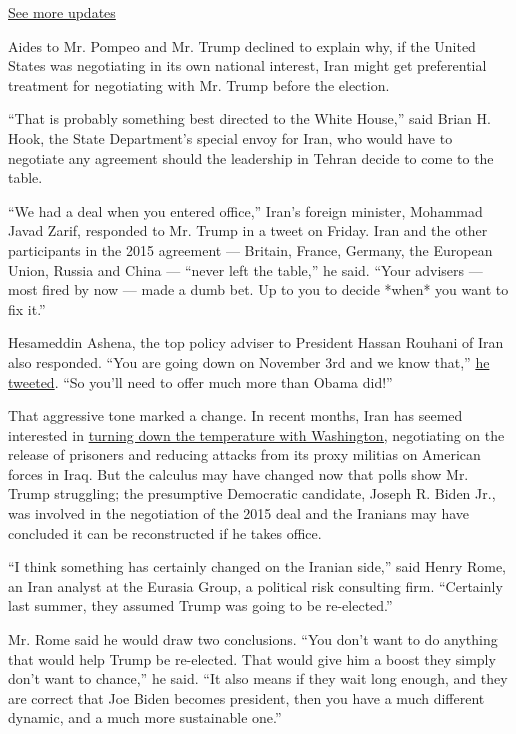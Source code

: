 \href{https://www.nytimes.com/2020/07/31/us/elections/biden-vs-trump.html?action=click\&pgtype=Article\&state=default\&region=MAIN_CONTENT_1\&context=storylines_live_updates}{See
more updates}

Aides to Mr. Pompeo and Mr. Trump declined to explain why, if the United
States was negotiating in its own national interest, Iran might get
preferential treatment for negotiating with Mr. Trump before the
election.

``That is probably something best directed to the White House,'' said
Brian H. Hook, the State Department's special envoy for Iran, who would
have to negotiate any agreement should the leadership in Tehran decide
to come to the table.

``We had a deal when you entered office,'' Iran's foreign minister,
Mohammad Javad Zarif, responded to Mr. Trump in a tweet on Friday. Iran
and the other participants in the 2015 agreement --- Britain, France,
Germany, the European Union, Russia and China --- ``never left the
table,'' he said. ``Your advisers --- most fired by now --- made a dumb
bet. Up to you to decide *when* you want to fix it.''

Hesameddin Ashena, the top policy adviser to President Hassan Rouhani of
Iran also responded. ``You are going down on November 3rd and we know
that,''
\href{https://twitter.com/hesamodin1/status/1268867213819346944}{he
tweeted}. ``So you'll need to offer much more than Obama did!''

That aggressive tone marked a change. In recent months, Iran has seemed
interested in
\href{https://www.nytimes.com/2020/05/19/world/middleeast/iran-us-relations.html?searchResultPosition=4}{turning
down the temperature with Washington,} negotiating on the release of
prisoners and reducing attacks from its proxy militias on American
forces in Iraq. But the calculus may have changed now that polls show
Mr. Trump struggling; the presumptive Democratic candidate, Joseph R.
Biden Jr., was involved in the negotiation of the 2015 deal and the
Iranians may have concluded it can be reconstructed if he takes office.

``I think something has certainly changed on the Iranian side,'' said
Henry Rome, an Iran analyst at the Eurasia Group, a political risk
consulting firm. ``Certainly last summer, they assumed Trump was going
to be re-elected.''

Mr. Rome said he would draw two conclusions. ``You don't want to do
anything that would help Trump be re-elected. That would give him a
boost they simply don't want to chance,'' he said. ``It also means if
they wait long enough, and they are correct that Joe Biden becomes
president, then you have a much different dynamic, and a much more
sustainable one.''

